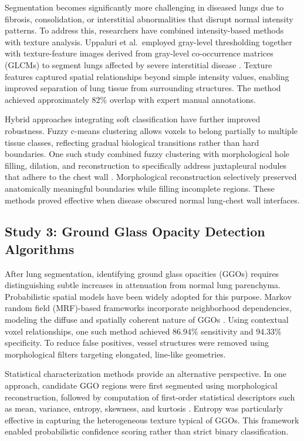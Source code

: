 Segmentation becomes significantly more challenging in diseased lungs due to fibrosis, consolidation, or interstitial abnormalities
that disrupt normal intensity patterns. To address this, researchers have combined intensity-based methods with texture analysis.
Uppaluri et al.\ employed gray-level thresholding together with texture-feature images derived from gray-level co-occurrence matrices
(GLCMs) to segment lungs affected by severe interstitial disease \cite{pmc2009}. Texture features captured spatial relationships
beyond simple intensity values, enabling improved separation of lung tissue from surrounding structures. The method achieved
approximately 82\% overlap with expert manual annotations.

Hybrid approaches integrating soft classification have further improved robustness. Fuzzy c-means clustering allows voxels to belong
partially to multiple tissue classes, reflecting gradual biological transitions rather than hard boundaries. One such study combined
fuzzy clustering with morphological hole filling, dilation, and reconstruction to specifically address juxtapleural nodules that
adhere to the chest wall \cite{biomedical2017}. Morphological reconstruction selectively preserved anatomically meaningful boundaries
while filling incomplete regions. These methods proved effective when disease obscured normal lung-chest wall interfaces.

\subsection{Study 3: Ground Glass Opacity Detection Algorithms}

After lung segmentation, identifying ground glass opacities (GGOs) requires distinguishing subtle increases in attenuation from
normal lung parenchyma. Probabilistic spatial models have been widely adopted for this purpose. Markov random field (MRF)-based
frameworks incorporate neighborhood dependencies, modeling the diffuse and spatially coherent nature of GGOs \cite{pmc_mrf}.
Using contextual voxel relationships, one such method achieved 86.94\% sensitivity and 94.33\% specificity. To reduce false positives,
vessel structures were removed using morphological filters targeting elongated, line-like geometries.

Statistical characterization methods provide an alternative perspective. In one approach, candidate GGO regions were first segmented
using morphological reconstruction, followed by computation of first-order statistical descriptors such as mean, variance, entropy,
skewness, and kurtosis \cite{iet2022}. Entropy was particularly effective in capturing the heterogeneous texture typical of GGOs.
This framework enabled probabilistic confidence scoring rather than strict binary classification.

